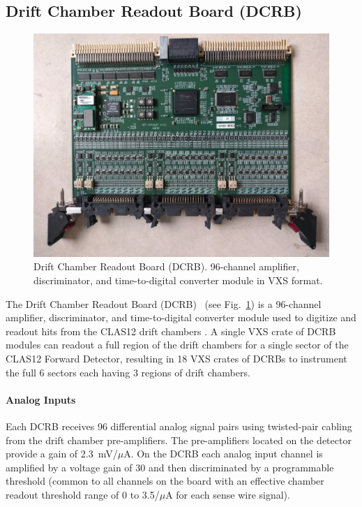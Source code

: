 \subsection{Drift Chamber Readout Board (DCRB)}

\begin{figure}[hbt]
	\centering
	\includegraphics[width=1.0\columnwidth,keepaspectratio]{img/dcrb_board.png}
	\caption{Drift Chamber Readout Board (DCRB). 96-channel amplifier, discriminator, and time-to-digital converter
          module in VXS format.}
	\label{fig:dcrb_board}
\end{figure}

The Drift Chamber Readout Board (DCRB)~\cite{dcrb-ref} (see Fig.~\ref{fig:dcrb_board}) is a 96-channel amplifier,
discriminator, and time-to-digital converter module used to digitize and readout hits from the CLAS12 drift chambers
\cite{dc-ref}. A single VXS crate of DCRB modules can readout a full region of the drift chambers for a single sector
of the CLAS12 Forward Detector, resulting in 18 VXS crates of DCRBs to instrument the full 6 sectors each having 3
regions of drift chambers.

\paragraph{Analog Inputs}
Each DCRB receives 96 differential analog signal pairs using twisted-pair cabling from the drift chamber pre-amplifiers.
The pre-amplifiers located on the detector provide a gain of 2.3~mV/$\mu$A. On the DCRB each analog input channel is
amplified by a voltage gain of 30 and then discriminated by a programmable threshold (common to all channels on the
board with an effective chamber readout threshold range of 0 to 3.5/$\mu$A for each sense wire signal).

